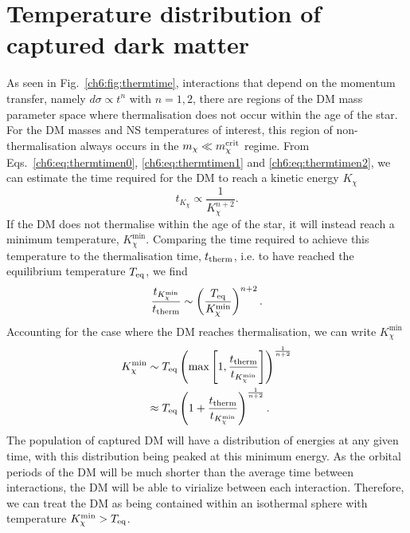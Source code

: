 \section{Temperature distribution of captured dark matter}
\label{app:sec:minTempDerivation}



As seen in Fig.~\ref{ch6:fig:thermtime}, interactions that depend on the momentum transfer, namely $d\sigma \propto t^n$ with $n = 1,2$, there are regions of the DM mass parameter space where thermalisation does not occur within the age of the star. For the DM masses and NS temperatures of interest, this region of non-thermalisation always occurs in the $m_\chi\ll m_\chi^{\rm crit}$ regime.
From Eqs.~\ref{ch6:eq:thermtimen0}, \ref{ch6:eq:thermtimen1} and \ref{ch6:eq:thermtimen2},  we can estimate the time required for the DM to reach a kinetic energy $K_\chi$ 
\begin{equation}
    t_{K_\chi} \propto \frac{1}{K_\chi^{n+2}}.
\end{equation}
% 
If the DM does not thermalise within the age of the star, it will instead reach a minimum temperature, $K_\chi^{\mathrm{min}}$.  Comparing the time required to achieve this temperature to the thermalisation time, $t_{\rm therm}$, i.e. to have reached the equilibrium temperature $T_{\rm eq}$, we find 
\begin{equation}
    \frac{t_{K_\chi^\mathrm{min}}}{t_{\rm therm}}  \sim \left( \frac{T_{\rm eq}}{K^{\rm min}_\chi} \right)^{n+2}. 
\end{equation}
Accounting for the case where the DM reaches thermalisation, we can write $K_\chi^\mathrm{min}$
\begin{align}
    K^{\rm min}_\chi & \sim T_{\rm eq} \left(\max\left[ 1,\frac{t_{\rm therm}}{t_{K_\chi^\mathrm{min}}}\right]\right)^{\frac{1}{n + 2}}\\
           & \approx T_{\rm eq} \left( 1 + \frac{t_{\rm therm}}{t_{K_\chi^\mathrm{min}}}\right)^{\frac{1}{n + 2}}. 
\end{align}
The population of captured DM will have a distribution of energies at any given time, with this distribution being peaked at this minimum energy.
As the orbital periods of the DM will be much shorter than the average time between interactions, the DM will be able to virialize between each interaction. Therefore, we can treat the DM as being contained within an isothermal sphere with temperature $K^{\rm min}_\chi > T_{\rm eq}$. 

